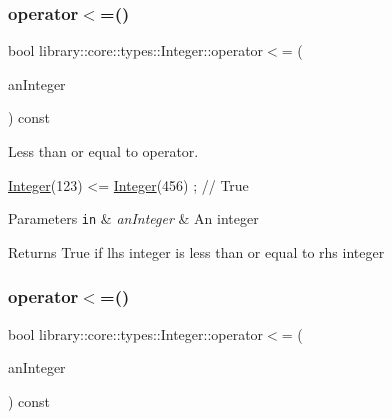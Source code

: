 \mbox{\label{classlibrary_1_1core_1_1types_1_1_integer_a57c084e8ca66e33675a706868b555962}} 
\subsubsection{\texorpdfstring{operator$<$=()}{operator<=()}\hspace{0.1cm}{\footnotesize\ttfamily [1/2]}}
{\footnotesize\ttfamily bool library\+::core\+::types\+::\+Integer\+::operator$<$= (\begin{DoxyParamCaption}\item[{const \hyperlink{classlibrary_1_1core_1_1types_1_1_integer}{Integer} \&}]{an\+Integer }\end{DoxyParamCaption}) const}



Less than or equal to operator. 


\begin{DoxyCode}
\hyperlink{classlibrary_1_1core_1_1types_1_1_integer_a6483b1c4e13e5ed6af5e7a58347efead}{Integer}(123) <= \hyperlink{classlibrary_1_1core_1_1types_1_1_integer_a6483b1c4e13e5ed6af5e7a58347efead}{Integer}(456) ; \textcolor{comment}{// True}
\end{DoxyCode}



\begin{DoxyParams}[1]{Parameters}
\mbox{\tt in}  & {\em an\+Integer} & An integer \\
\hline
\end{DoxyParams}
\begin{DoxyReturn}{Returns}
True if lhs integer is less than or equal to rhs integer 
\end{DoxyReturn}
\mbox{\label{classlibrary_1_1core_1_1types_1_1_integer_a09f6844cd7557f087116a50869765eaa}} 
\subsubsection{\texorpdfstring{operator$<$=()}{operator<=()}\hspace{0.1cm}{\footnotesize\ttfamily [2/2]}}
{\footnotesize\ttfamily bool library\+::core\+::types\+::\+Integer\+::operator$<$= (\begin{DoxyParamCaption}\item[{const \hyperlink{classlibrary_1_1core_1_1types_1_1_integer_a623afb1580f870fd8a1997b1c12c917d}{Integer\+::\+Value\+Type} \&}]{an\+Integer }\end{DoxyParamCaption}) const}

